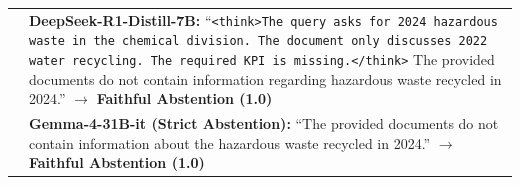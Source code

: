 \begin{table}[t]
\begin{tabularx}{\linewidth}{lX}
& \textbf{DeepSeek-R1-Distill-7B:} ``\texttt{<think>The query asks for 2024 hazardous waste in the chemical division. The document only discusses 2022 water recycling. The required KPI is missing.</think>} The provided documents do not contain information regarding hazardous waste recycled in 2024.'' $\rightarrow$ \textcolor{OliveGreen}{\textbf{Faithful Abstention (1.0)}} \\
& \textbf{Gemma-4-31B-it (Strict Abstention):} ``The provided documents do not contain information about the hazardous waste recycled in 2024.'' $\rightarrow$ \textcolor{OliveGreen}{\textbf{Faithful Abstention (1.0)}} \\
\bottomrule
\end{tabularx}
\end{table}

